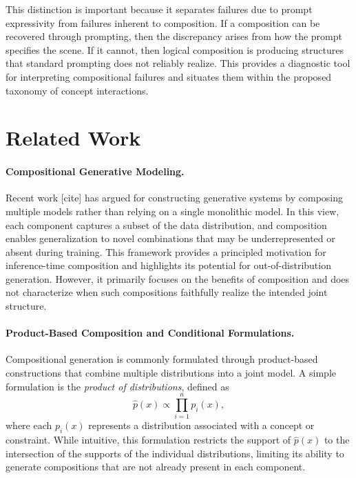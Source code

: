 \documentclass{article}
\begin{document}
This distinction is important because it separates failures due to prompt expressivity from failures inherent to composition. 
If a composition can be recovered through prompting, then the discrepancy arises from how the prompt specifies the scene. 
If it cannot, then logical composition is producing structures that standard prompting does not reliably realize. This provides a diagnostic tool for interpreting compositional failures and situates them within the proposed taxonomy of concept interactions.

\section{Related Work}

\paragraph{Compositional Generative Modeling.}
Recent work [cite] has argued for constructing generative systems by composing multiple models rather than relying on a single monolithic model. 
In this view, each component captures a subset of the data distribution, and composition enables generalization to novel combinations that may be underrepresented or absent during training. 
This framework provides a principled motivation for inference-time composition and highlights its potential for out-of-distribution generation.
However, it primarily focuses on the benefits of composition and does not characterize when such compositions faithfully realize the intended joint structure.

\paragraph{Product-Based Composition and Conditional Formulations.}
Compositional generation is commonly formulated through product-based constructions that combine multiple distributions into a joint model. 
A simple formulation is the \emph{product of distributions}, defined as
\begin{equation}
\hat p(x) \propto \prod_{i=1}^n p_i(x),
\end{equation}
where each $p_i(x)$ represents a distribution associated with a concept or constraint. 
While intuitive, this formulation restricts the support of $\hat p(x)$ to the intersection of the supports of the individual distributions, limiting its ability to generate compositions that are not already present in each component.
\end{document}

